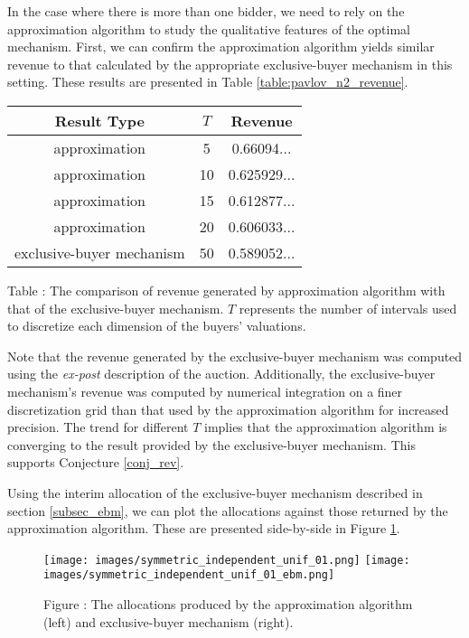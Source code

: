 In the case where there is more than one bidder, we need to rely on the approximation algorithm to study the qualitative features of the optimal mechanism. First, we can confirm the approximation algorithm yields similar revenue to that calculated by the appropriate exclusive-buyer mechanism in this setting. These results are presented in Table \ref{table:pavlov_n2_revenue}.

\begin{center}
    \begin{tabular}{ |c|c|c| } 
    \hline
    Result Type & $T$ & Revenue \\
    \hline
    \hline
    approximation & 5 & 0.66094... \\ 
    approximation & 10 & 0.625929... \\ 
    approximation & 15 & 0.612877... \\ 
    approximation & 20 & 0.606033... \\ 
    exclusive-buyer mechanism & 50 & 0.589052... \\
    \hline
    \end{tabular}

    \vspace{1mm}
    \raggedright{\small {\sc Table \thefig\label{table:pavlov_n2_revenue}:} The comparison of revenue generated by approximation algorithm with that of the exclusive-buyer mechanism. $T$ represents the number of intervals used to discretize each dimension of the buyers' valuations.}
\end{center}

\noindent Note that the revenue generated by the exclusive-buyer mechanism was computed using the \textit{ex-post} description of the auction. Additionally, the exclusive-buyer mechanism's revenue was computed by numerical integration on a finer discretization grid than that used by the approximation algorithm for increased precision. The trend for different $T$ implies that the approximation algorithm is converging to the result provided by the exclusive-buyer mechanism. This supports Conjecture \ref{conj_rev}. 

Using the interim allocation of the exclusive-buyer mechanism described in section \ref{subsec_ebm}, we can plot the allocations against those returned by the approximation algorithm. These are presented side-by-side in Figure \ref{fig:pavlov_n2_alloc}.

\begin{figure}[H]
    \begin{center}
    \texttt{[image: images/symmetric\_independent\_unif\_01.png]}
    \texttt{[image: images/symmetric\_independent\_unif\_01\_ebm.png]}
    \end{center}
    
    \vspace{1mm}
    \raggedright{\small {\sc Figure \thefig\label{fig:pavlov_n2_alloc}:} The allocations produced by the approximation algorithm (left) and exclusive-buyer mechanism (right).} 
\end{figure}

